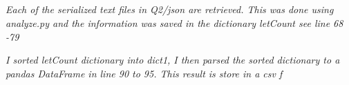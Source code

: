 \documentclass[12pt]{article}
\begin{document}
\begin{itemize}
        \emph{\\  \\ \color{blue}{Answer}}
        \emph{\\ \\Each of the serialized text files in Q2\slash json are retrieved. This was done using analyze.py and the information was saved in the dictionary letCount see line 68 -79}
        
        \emph{I sorted letCount dictionary into dict1, I then parsed the sorted dictionary to a pandas DataFrame in line 90 to 95. This result is store in a csv f} 
        

\end{itemize}
\end{document}
